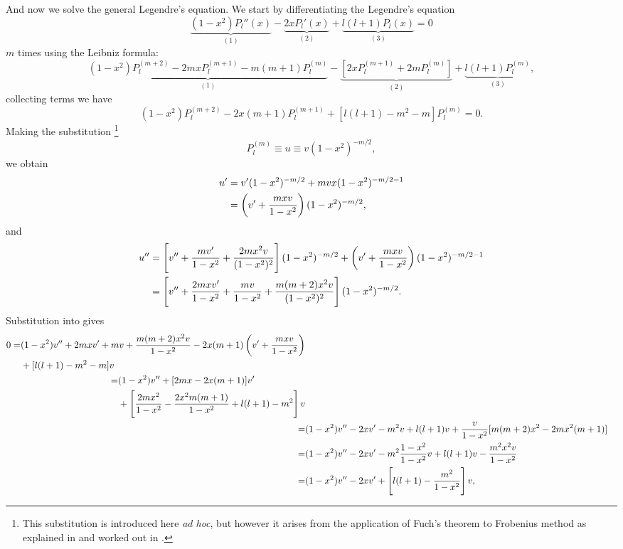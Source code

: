 And now we solve the general Legendre's equation. We start by differentiating the 
Legendre's equation
\begin{equation}
\underbrace{(1-x^2)P_l''(x)}_{(1)}-\underbrace{2xP_l'(x)}_{(2)}+\underbrace{l(l+1)P_l(x)}_{(3)}=0
\end{equation}
$m$ times using the Leibniz formula: 
\begin{equation}
\label{gen_lgdeq}
\underbrace{(1-x^2)P_l^{(m+2)}-2mxP_l^{(m+1)}-m(m+1)P_l^{(m)}}_{(1)}-\underbrace{[2xP_l^{(m+1)}+2mP_l^{(m)} ]}_{(2)}+\underbrace{l(l+1)P_l^{(m)}}_{(3)}, 
\end{equation}
collecting terms we have
\begin{equation}
(1-x^2)P_l^{(m+2)}-2x(m+1)P_l^{(m+1)}+[l(l+1)-m^2-m]P_l^{(m)}=0. 
\end{equation}
Making the substitution \footnote{This substitution is introduced here \textit{ad hoc}, but however it arises 
from the application of Fuch's theorem to Frobenius method as explained in \cite{fuchs} and worked out in \cite{ass_lgdeq_stack}.}
\begin{equation}
P_l^{(m)}\equiv u\equiv v(1-x^2)^{-m/2}, 
\end{equation}
we obtain
\begin{equation}
\begin{aligned}
u'&=v'(1-x^2)^{-m/2}+mvx(1-x^2)^{-m/2-1}\\
&=\left(v'+\frac{mxv}{1-x^2} \right)(1-x^2)^{-m/2}, 
\end{aligned}
\end{equation}
and 
\begin{equation}
\begin{aligned}
u''&=\left[v''+\frac{mv'}{1-x^2}+\frac{2mx^2v}{(1-x^2)^2}\right](1-x^2)^{-m/2}+\left(v'+\frac{mxv}{1-x^2} \right)(1-x^2)^{-m/2-1}\\
&=\left[v''+\frac{2mxv'}{1-x^2}+\frac{mv}{1-x^2}+\frac{m(m+2)x^2v}{(1-x^2)^2} \right](1-x^2)^{-m/2}.
\end{aligned}
\end{equation}
Substitution into  gives 
\begin{subequations}
\begin{align}
\begin{split}
0=&(1-x^2)v''+2mxv'+mv+\frac{m(m+2)x^2v}{1-x^2}-2x(m+1)\left(v'+\frac{mxv}{1-x^2} \right)\\
&+[l(l+1)-m^2-m]v
\end{split}\\
\begin{split}
=&(1-x^2)v''+[2mx-2x(m+1)]v'\\&
+\left[\frac{2mx^2}{1-x^2}-\frac{2x^2m(m+1)}{1-x^2}+l(l+1)-m^2 \right]v
\end{split}\\
=&(1-x^2)v''-2xv'-m^2v+l(l+1)v+\frac{v}{1-x^2}[m(m+2)x^2-2mx^2(m+1)]\\
=&(1-x^2)v''-2xv'-m^2\frac{1-x^2}{1-x^2}v+l(l+1)v-\frac{m^2x^2v}{1-x^2}\\
=&(1-x^2)v''-2xv'+\left[l(l+1)-\frac{m^2}{1-x^2} \right]v, 
\end{align}
\end{subequations}
